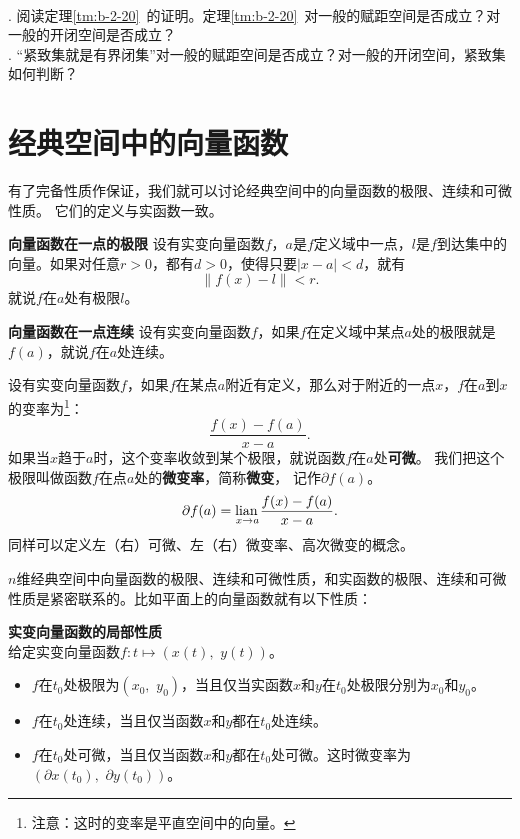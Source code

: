 \documentclass[12pt,UTF8]{ctexbook}
\begin{document}
\begin{appendix}
\begin{sk}
    \mbox{}\\
    . 阅读定理\ref{tm:b-2-20}~的证明。定理\ref{tm:b-2-20}~对一般的赋距空间是否成立？对一般的开闭空间是否成立？\\
    . “紧致集就是有界闭集”对一般的赋距空间是否成立？对一般的开闭空间，紧致集如何判断？
\end{sk}

\section{经典空间中的向量函数}
有了完备性质作保证，我们就可以讨论经典空间中的向量函数的极限、连续和可微性质。
它们的定义与实函数一致。
\begin{df}{\textbf{向量函数在一点的极限}}
    设有实变向量函数$f$，$a$是$f$定义域中一点，$l$是$f$到达集中的向量。如果对任意$r>0$，都有$d>0$，使得只要$|x - a| < d$，就有
    $$\left\|f(x) - l\right\| < r.$$
    就说$f$在$a$处有极限$l$。
\end{df}

\begin{df}{\textbf{向量函数在一点连续}}
    设有实变向量函数$f$，如果$f$在定义域中某点$a$处的极限就是$f(a)$，就说$f$在$a$处连续。
\end{df}

\begin{df}
    设有实变向量函数$f$，如果$f$在某点$a$附近有定义，那么对于附近的一点$x$，$f$在$a$到$x$的变率为\footnote{注意：这时的变率是平直空间中的向量。}：
    $$ \frac{f(x) - f(a)}{x - a}.$$
    如果当$x$趋于$a$时，这个变率收敛到某个极限，就说函数$f$在$a$处\textbf{可微}。
    我们把这个极限叫做函数$f$在点$a$处的\textbf{微变率}，简称\textbf{微变}，
    记作$\partial f(a)$。
    $$ \partial f(a) = \underset{{x\to a}}{\operatorname{lian}\,} \frac{f(x) - f(a)}{x - a}. $$
    同样可以定义左（右）可微、左（右）微变率、高次微变的概念。
\end{df}

$n$维经典空间中向量函数的极限、连续和可微性质，和实函数的极限、连续和可微性质是紧密联系的。比如平面上的向量函数就有以下性质：
\begin{tm}\label{tm:b-1-10}
    \textbf{实变向量函数的局部性质}\\
    给定实变向量函数$f: t\mapsto (x(t),\,\, y(t))$。
    \begin{itemize}
        \item $f$在$t_0$处极限为$(x_0,\,\,y_0)$，当且仅当实函数$x$和$y$在$t_0$处极限分别为$x_0$和$y_0$。
        \item $f$在$t_0$处连续，当且仅当函数$x$和$y$都在$t_0$处连续。
        \item $f$在$t_0$处可微，当且仅当函数$x$和$y$都在$t_0$处可微。这时微变率为$(\partial x(t_0),\,\,\partial y(t_0))$。
    \end{itemize}
\end{tm}


\end{appendix}
\end{document}
